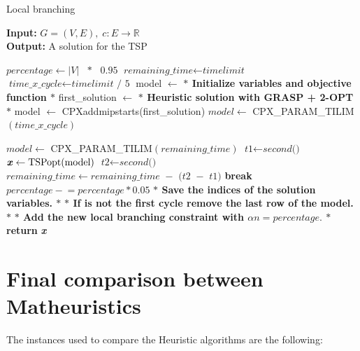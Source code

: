 \begin{algorithm} [H]
    \caption{Local branching}\label{Local branching}
    \hspace*{\algorithmicindent} \textbf{Input:} $G = (V,E) , \; c : E \rightarrow \mathbb{R}$\\
    \hspace*{\algorithmicindent} \textbf{Output:}  A solution for the TSP
    \begin{algorithmic}[1]
    \State $\textit{percentage} \gets \textit{$|V|$ $\ast$ $0.95$}$
    \State $\textit{remaining\_time} \gets \textit{timelimit}$
    \State $\textit{time\_x\_cycle} \gets \textit{timelimit / 5}$
    \State model $ \leftarrow $ \textbf{$\ast$ Initialize variables and objective function $\ast$ }
    \State first\_solution $ \leftarrow $ \textbf{$\ast$ Heuristic solution with GRASP + 2-OPT $\ast$ }
    \State model $ \leftarrow $  CPXaddmipstarts(first\_solution)
	\State $ model \gets $ CPX\_PARAM\_TILIM$(\textit{time\_x\_cycle}) $
	
	\Else \State $ model \gets $ CPX\_PARAM\_TILIM$(\textit{remaining\_time}) $
	\EndIf
	\State $\textit{t1} \gets \textit{second()}$
    	\State $\textbf{\textit{x}} \gets \text{TSPopt}(\text{model}) $\;
	\State $\textit{t2} \gets \textit{second()}$
	\State $\textit{remaining\_time} \gets \textit{remaining\_time $-$ (t2 $-$ t1)}$
	\State \textbf{break}
	\EndIf
	\State $\textit{percentage} \mathrel{-}= \textit{percentage} * 0.05$
	\State \textbf{$\ast$ Save the indices of the solution variables. $\ast$}
	\State \textbf{$\ast$ If is not the first cycle remove the last row of the model. $\ast$}
	\State \textbf{$\ast$ Add the new local branching constraint with $\alpha n = percentage. $ $\ast$}
    \EndWhile
    \State \textbf{return} \textbf{\textit{x}}
    \end{algorithmic}
    \label{alg:lb}
    \end{algorithm}

\section{Final comparison between Matheuristics}
The instances used to compare the Heuristic algorithms are the following: 

